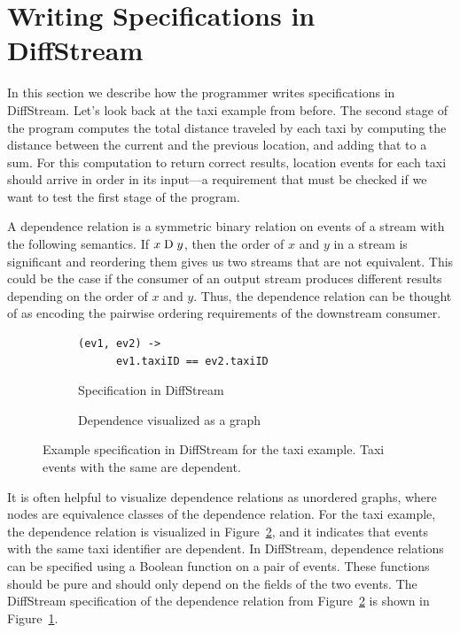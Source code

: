 \section{Writing Specifications in DiffStream}
\label{diffstream:sec:dependence-relation}

In this section we describe how the programmer writes specifications in DiffStream.
Let's look back at the taxi example from before. The second stage of the program
computes the total distance traveled by each taxi by computing the
distance between the current and the previous location, and adding
that to a sum. For this computation to return correct results,
location events for each taxi should arrive in order in its input---a
requirement that must be checked if we want to test the first stage of
the program.

A dependence relation is a symmetric binary relation on events of a
stream with the following semantics.
If $x \mathrel{\mathrm{D}} y$, then the order of
$x$ and $y$ in a stream is significant and reordering them gives us
two streams that are not equivalent. This could be the case if the
consumer of an output stream produces different results depending on
the order of $x$ and $y$.  Thus, the dependence relation can be
thought of as encoding the pairwise ordering requirements of the
downstream consumer.

\begin{figure}[t]
  \centering \footnotesize{}
  \begin{subfigure}[b]{0.46\textwidth}
    \centering
    \begin{lstlisting}[basicstyle=\ttfamily\small]
  (ev1, ev2) ->
      ev1.taxiID == ev2.taxiID
    \end{lstlisting}
    \caption{Specification in DiffStream}
    \label{diffstream:fig:simple-taxi-example-dependency-spec}
  \end{subfigure}%
  \qquad
  \begin{subfigure}[b]{0.46\textwidth}
    \centering
    \caption{Dependence visualized as a graph}
    \label{diffstream:fig:simple-taxi-example-dependency-vis}
  \end{subfigure}%
  \caption{Example specification in DiffStream for the taxi example. Taxi events with the same  are dependent.}
  \label{diffstream:fig:example-dependencies}
\end{figure}

It is often helpful to visualize dependence relations as unordered
graphs, where nodes are equivalence classes of the dependence
relation. For the taxi example, the dependence relation is visualized
in Figure~\ref{diffstream:fig:simple-taxi-example-dependency-vis}, and it indicates that
events with the same taxi identifier are dependent. In DiffStream,
dependence relations can be specified using a Boolean function on a pair
of events. These functions should be pure and should only depend on
the fields of the two events. The DiffStream specification of the dependence relation from Figure~\ref{diffstream:fig:simple-taxi-example-dependency-vis} is shown in Figure~\ref{diffstream:fig:simple-taxi-example-dependency-spec}.

